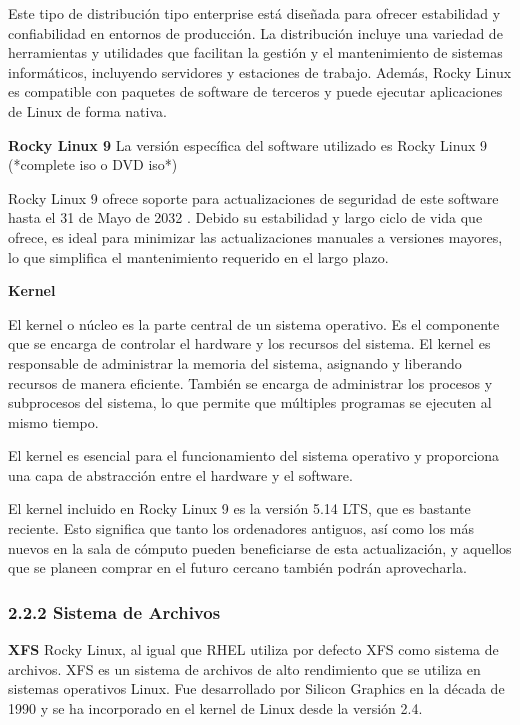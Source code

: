 \begin{doublespace}
\begin{multicols}{2}
    Este tipo de distribución tipo enterprise está diseñada para ofrecer estabilidad y confiabilidad en entornos de producción. La distribución incluye una variedad de herramientas y utilidades que facilitan la gestión y el mantenimiento de sistemas informáticos, incluyendo servidores y estaciones de trabajo. Además, Rocky Linux es compatible con paquetes de software de terceros y puede ejecutar aplicaciones de Linux de forma nativa. \cite{RL-1}

    \textbf{Rocky Linux 9}
    \newline
    La versión específica del software utilizado es Rocky Linux 9 (*complete iso o DVD iso*) \cite{RL9-download-1} \cite{RL9-release-1}  \cite{RHEL-release-1} 

    Rocky Linux 9 ofrece soporte para actualizaciones de seguridad de este software hasta el 31 de Mayo de 2032 \cite{RL9-EOL-1}. Debido su estabilidad y largo ciclo de vida que ofrece, es ideal para minimizar las actualizaciones manuales a versiones mayores, lo que simplifica el mantenimiento requerido en el largo plazo.

    \textbf{Kernel}
    \newline
 
    El kernel o núcleo es la parte central de un sistema operativo. Es el componente que se encarga de controlar el hardware y los recursos del sistema. El kernel es responsable de administrar la memoria del sistema, asignando y liberando recursos de manera eficiente. También se encarga de administrar los procesos y subprocesos del sistema, lo que permite que múltiples programas se ejecuten al mismo tiempo.

    El kernel es esencial para el funcionamiento del sistema operativo y proporciona una capa de abstracción entre el hardware y el software.  \cite{RHEL-kernel-1}

    El kernel incluido en Rocky Linux 9 es la versión 5.14 LTS, que es bastante reciente. Esto significa que tanto los ordenadores antiguos, así como los más nuevos en la sala de cómputo pueden beneficiarse de esta actualización, y aquellos que se planeen comprar en el futuro cercano también podrán aprovecharla. \cite{RL9-release-1}
    \newline

    \subsubsection{2.2.2 Sistema de Archivos}

    \textbf{XFS}
    \newline
    Rocky Linux, al igual que RHEL utiliza por defecto XFS como sistema de archivos. XFS es un sistema de archivos de alto rendimiento que se utiliza en sistemas operativos Linux. Fue desarrollado por Silicon Graphics en la década de 1990 y se ha incorporado en el kernel de Linux desde la versión 2.4.


\end{multicols}
\end{doublespace}
